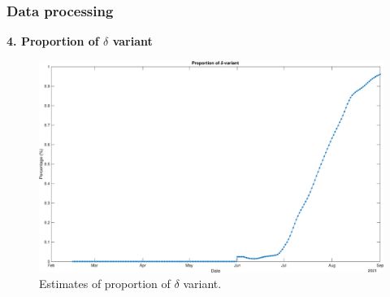 \documentclass[aspectratio=169, 9pt, xcolor=dvipsnames]{beamer}
\begin{document}
	\begin{frame}\frametitle{Data processing}
	    \textbf{4. Proportion of $\delta$ variant} \\
	    \begin{minipage}{0.3\textwidth}
	    	\begin{table}
	    		\caption{질병관리청에서 보도된 검출된 델타 변이 비율}
	    	\end{table}
	    \end{minipage}
	    \hfill
	    \begin{minipage}{0.6\textwidth}
	    	\begin{figure}
	    		\centering
	    		\includegraphics[width=\textwidth]{../results/data/delta_proportion.eps}
	    		\caption{Estimates of proportion of $\delta$ variant.}
	    	\end{figure}
	    \end{minipage}
	\end{frame}
\end{document}

